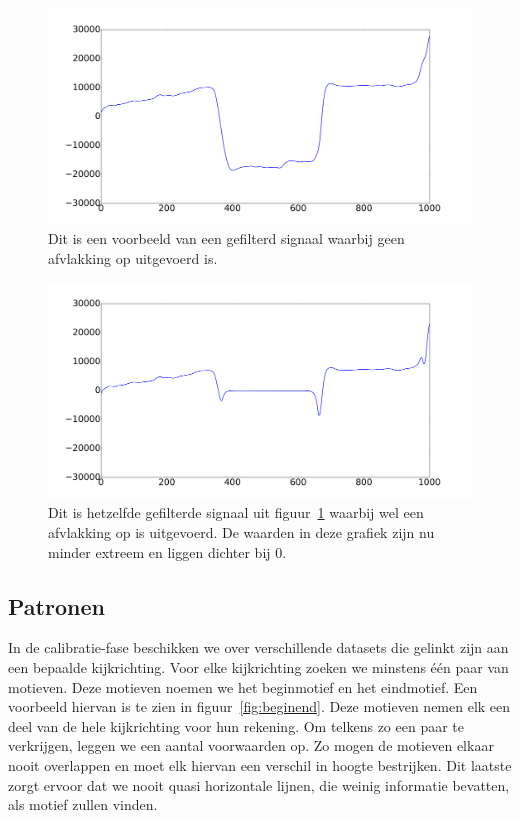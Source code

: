 \documentclass{article}
\begin{document}
\begin{figure}[h]
\centering
\includegraphics[width=\linewidth]{images/afvlakking_original}
\caption{Dit is een voorbeeld van een gefilterd signaal waarbij geen afvlakking op uitgevoerd is.}
\label{fig:afvlakking_original}
\end{figure}

\begin{figure}[h]
\centering
\includegraphics[width=\linewidth]{images/afvlakking}
\caption{Dit is hetzelfde gefilterde signaal uit figuur~\ref{fig:afvlakking_original} waarbij wel een afvlakking op is uitgevoerd. De waarden in deze grafiek zijn nu minder extreem en liggen dichter bij 0.}
\label{fig:afvlakking}
\end{figure}

\subsection{Patronen}

In de calibratie-fase beschikken we over verschillende datasets die gelinkt zijn aan een bepaalde kijkrichting. Voor elke kijkrichting zoeken we minstens één paar van motieven. Deze motieven noemen we het beginmotief en het eindmotief. Een voorbeeld hiervan is te zien in figuur~\ref{fig:beginend}. Deze motieven nemen elk een deel van de hele kijkrichting voor hun rekening. Om telkens zo een paar te verkrijgen, leggen we een aantal voorwaarden op. Zo mogen de motieven elkaar nooit overlappen en moet elk hiervan een verschil in hoogte bestrijken. Dit laatste zorgt ervoor dat we nooit quasi horizontale lijnen, die weinig informatie bevatten, als motief zullen vinden.
\end{document}
